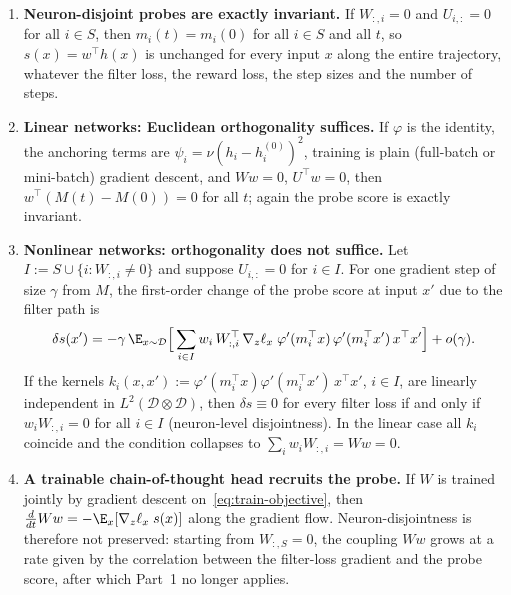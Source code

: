 \begin{theorem}\label{thm:geometry-training}
\leavevmode
\begin{enumerate}
  \item \textbf{Neuron-disjoint probes are exactly invariant.} If $W_{:,i} = 0$ and $U_{i,:} = 0$ for all $i \in S$, then $m_i(t) = m_i(0)$ for all $i \in S$ and all $t$, so $s(x) = w^\top h(x)$ is unchanged for every input $x$ along the entire trajectory, whatever the filter loss, the reward loss, the step sizes and the number of steps.
  \item \textbf{Linear networks: Euclidean orthogonality suffices.} If $\varphi$ is the identity, the anchoring terms are $\psi_i = \nu(h_i - h_i^{(0)})^2$, training is plain (full-batch or mini-batch) gradient descent, and $W w = 0$, $U^\top w = 0$, then $w^\top (M(t) - M(0)) = 0$ for all $t$; again the probe score is exactly invariant.
  \item \textbf{Nonlinear networks: orthogonality does not suffice.} Let $I := S \cup \{i : W_{:,i} \neq 0\}$ and suppose $U_{i,:} = 0$ for $i \in I$. For one gradient step of size $\gamma$ from $M$, the first-order change of the probe score at input $x'$ due to the filter path is
  \begin{equation}\label{eq:ntk-drift}
    \delta s(x') = -\gamma\, \E_{x \sim \mathcal{D}}\Big[\sum_{i \in I} w_i\, W_{:,i}^\top\, \nabla_z \ell_x \; \varphi'(m_i^\top x)\, \varphi'(m_i^\top x')\, x^\top x'\Big] + o(\gamma).
  \end{equation}
  If the kernels $k_i(x, x') := \varphi'(m_i^\top x)\varphi'(m_i^\top x')\, x^\top x'$, $i \in I$, are linearly independent in $L^2(\mathcal{D} \otimes \mathcal{D})$, then $\delta s \equiv 0$ for every filter loss if and only if $w_i W_{:,i} = 0$ for all $i \in I$ (neuron-level disjointness). In the linear case all $k_i$ coincide and the condition collapses to $\sum_i w_i W_{:,i} = W w = 0$.
  \item \textbf{A trainable chain-of-thought head recruits the probe.} If $W$ is trained jointly by gradient descent on~\eqref{eq:train-objective}, then $\tfrac{d}{dt} W w = -\E_x[\nabla_z \ell_x\; s(x)]$ along the gradient flow. Neuron-disjointness is therefore not preserved: starting from $W_{:,S} = 0$, the coupling $W w$ grows at a rate given by the correlation between the filter-loss gradient and the probe score, after which Part~1 no longer applies.
\end{enumerate}
\end{theorem}

